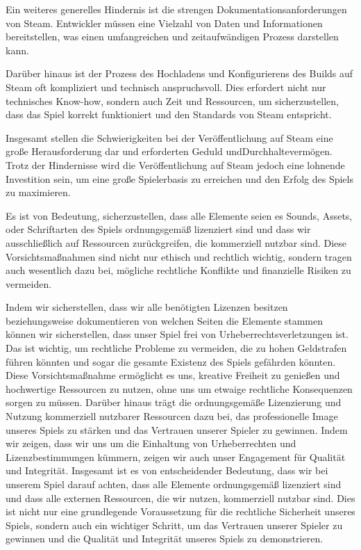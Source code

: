 Ein weiteres generelles Hindernis ist die strengen Dokumentationsanforderungen von Steam. Entwickler müssen eine Vielzahl von Daten und Informationen bereitstellen, was einen umfangreichen und zeitaufwändigen Prozess darstellen kann.

Darüber hinaus ist der Prozess des Hochladens und Konfigurierens des Builds auf Steam oft kompliziert und technisch anspruchsvoll. Dies erfordert nicht nur technisches Know-how, sondern auch Zeit und Ressourcen, um sicherzustellen, dass das Spiel korrekt funktioniert und den Standards von Steam entspricht.

Insgesamt stellen die Schwierigkeiten bei der Veröffentlichung auf Steam eine große Herausforderung dar und erforderten Geduld undDurchhaltevermögen.
Trotz der Hindernisse wird die Veröffentlichung auf Steam jedoch eine lohnende Investition sein, um eine große Spielerbasis zu erreichen und den Erfolg des Spiels zu maximieren.



Es ist von Bedeutung, sicherzustellen, dass alle Elemente seien es Sounds, Assets, oder Schriftarten des Spiels ordnungsgemäß lizenziert sind und dass wir ausschließlich auf Ressourcen zurückgreifen, die kommerziell nutzbar sind.
Diese Vorsichtsmaßnahmen sind nicht nur ethisch und rechtlich wichtig, sondern tragen auch wesentlich dazu bei, mögliche rechtliche Konflikte und finanzielle Risiken zu vermeiden.


Indem wir sicherstellen, dass wir alle benötigten Lizenzen besitzen beziehungsweise dokumentieren von welchen Seiten die Elemente stammen können wir sicherstellen, dass unser Spiel frei von Urheberrechtsverletzungen ist.
Das ist wichtig, um rechtliche Probleme zu vermeiden, die zu hohen Geldstrafen führen könnten und sogar die gesamte Existenz des Spiels gefährden könnten.
Diese Vorsichtsmaßnahme ermöglicht es uns, kreative Freiheit zu genießen und hochwertige Ressourcen zu nutzen, ohne uns um etwaige rechtliche Konsequenzen sorgen zu müssen.
Darüber hinaus trägt die ordnungsgemäße Lizenzierung und Nutzung kommerziell nutzbarer Ressourcen dazu bei, das professionelle Image unseres Spiels zu stärken und das Vertrauen unserer Spieler zu gewinnen.
Indem wir zeigen, dass wir uns um die Einhaltung von Urheberrechten und Lizenzbestimmungen kümmern, zeigen wir auch unser Engagement für Qualität und Integrität.
Insgesamt ist es von entscheidender Bedeutung, dass wir bei unserem Spiel darauf achten, dass alle Elemente ordnungsgemäß lizenziert sind und dass alle externen Ressourcen,
die wir nutzen, kommerziell nutzbar sind. Dies ist nicht nur eine grundlegende Voraussetzung für die rechtliche Sicherheit unseres Spiels, sondern auch ein wichtiger Schritt,
um das Vertrauen unserer Spieler zu gewinnen und die Qualität und Integrität unseres Spiels zu demonstrieren.
%

\renewcommand{\kapitelautor}{}